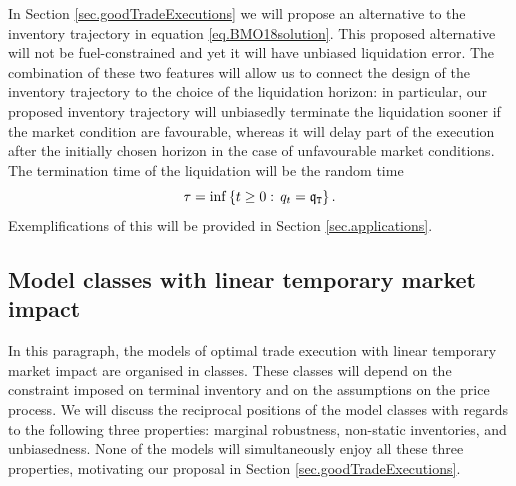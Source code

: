 \documentclass[10pt,a4paper]{article}
\begin{document}
	In Section \ref{sec.goodTradeExecutions} we will propose an alternative to the inventory trajectory in equation \eqref{eq.BMO18solution}. This proposed alternative will not be fuel-constrained and yet it will have unbiased liquidation error. The combination of these two features will allow us to connect the design of the inventory trajectory to the choice of the liquidation horizon: in particular, our proposed inventory trajectory will unbiasedly terminate the liquidation sooner if the market condition are favourable, whereas it will delay part of the execution after the initially chosen horizon in the case of unfavourable market conditions. The termination time of the liquidation will be the random time
	\begin{equation}
	\tau = \inf\left \lbrace t\geq 0 : \, q_t = \mathfrak{q}_{\mathtt{T} } \right \rbrace.
	\end{equation}
	Exemplifications of this will be provided in Section \ref{sec.applications}. 
	
	\subsection{Model classes with linear temporary market impact}\label{sec.modelClasses}
	In this  paragraph, the models of optimal trade execution with linear temporary market impact are organised in classes. These classes will depend on the constraint imposed on terminal inventory and on the assumptions on the price process. We will discuss the reciprocal positions of the model classes with regards to the following three properties:  marginal robustness, non-static inventories, and unbiasedness. None of the models will simultaneously enjoy all these three properties, motivating our  proposal in Section \ref{sec.goodTradeExecutions}.
	
\end{document}
